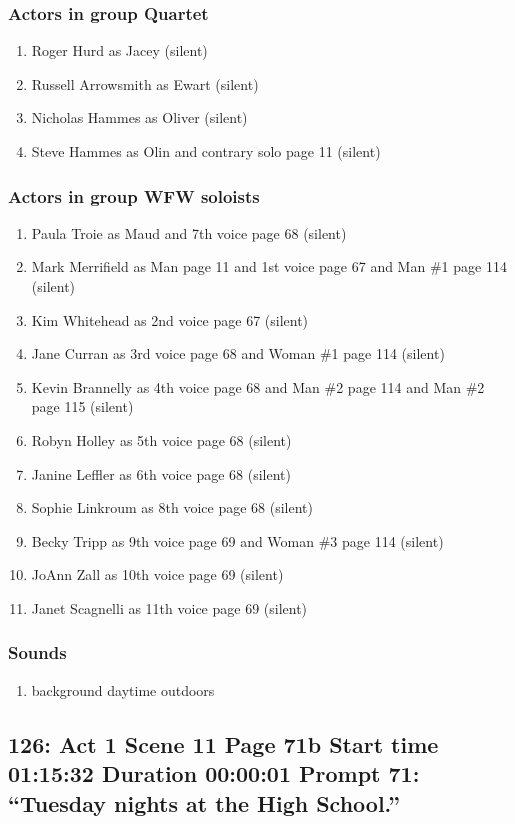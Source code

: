 \subsubsection{Actors in group Quartet}
\begin{enumerate}
\item Roger Hurd as Jacey (silent)
\item Russell Arrowsmith as Ewart (silent)
\item Nicholas Hammes as Oliver (silent)
\item Steve Hammes as Olin and contrary solo page 11 (silent)
\end{enumerate}
\subsubsection{Actors in group WFW soloists}
\begin{enumerate}
\item Paula Troie as Maud and 7th voice page 68 (silent)
\item Mark Merrifield as Man page 11 and 1st voice page 67 and Man \#1 page 114 (silent)
\item Kim Whitehead as 2nd voice page 67 (silent)
\item Jane Curran as 3rd voice page 68 and Woman \#1 page 114 (silent)
\item Kevin Brannelly as 4th voice page 68 and Man \#2 page 114 and Man \#2 page 115 (silent)
\item Robyn Holley as 5th voice page 68 (silent)
\item Janine Leffler as 6th voice page 68 (silent)
\item Sophie Linkroum as 8th voice page 68 (silent)
\item Becky Tripp as 9th voice page 69 and Woman \#3 page 114 (silent)
\item JoAnn Zall as 10th voice page 69 (silent)
\item Janet Scagnelli as 11th voice page 69 (silent)
\end{enumerate}

\subsubsection{Sounds}
\begin{enumerate}
\item background daytime outdoors
\end{enumerate}
\subsection{126: Act 1 Scene 11 Page 71b Start time 01:15:32 Duration 00:00:01 Prompt 71: ``Tuesday nights at the High School.''}
